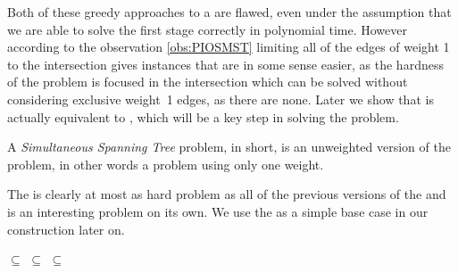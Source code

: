 Both of these greedy approaches to a \OISMST are flawed, even under the assumption that we are able to solve the first stage correctly in polynomial time. However according to the observation \ref{obs:PIOSMST} limiting all of the edges of weight 1 to the intersection gives instances that are in some sense easier, as the hardness of the problem is focused in the intersection which can be solved without considering exclusive weight~1 edges, as there are none. Later we show that \POISMST is actually equivalent to \OISMST, which will be a key step in solving the \OISMST problem. 

\begin{definition}
A {\em Simultaneous Spanning Tree} problem, \SST in short, is an unweighted version of the \SMST problem, in other words a \SMST problem using only one weight. 
\end{definition}

The \SST is clearly at most as hard problem as all of the previous versions of the \SMST and is an interesting problem on its own. We use the \SST as a simple base case in our construction later on. 

\begin{observation}
\SST $\subseteq$ \POISMST $\subseteq$ \OISMST $\subseteq$ \SMST 
\end{observation}